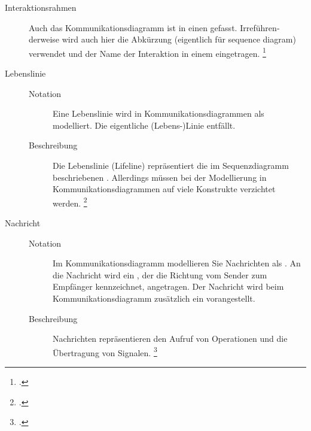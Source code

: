 \documentclass{lehramt-informatik-haupt}
\begin{document}
\begin{description}

%

\item[Interaktionsrahmen] Auch das Kommunikationsdiagramm ist in einen
 gefasst. Irreführen­ derweise wird auch hier
die Abkürzung  (eigentlich für sequence diagram) verwendet und
der Name der Interaktion in einem  eingetragen.
\footcite[Seite 478]{rupp}

%

\item[Lebenslinie] \strut
\begin{description}
\item[Notation] Eine Lebenslinie wird in Kommunikationsdiagrammen als
 modelliert. Die eigentliche (Lebens-)Linie
entfällt.

\item[Beschreibung] Die Lebenslinie (Lifeline) repräsentiert die im
Sequenzdiagramm beschriebenen . Allerdings
müssen bei der Modellierung in Kommunikationsdiagrammen auf viele
Konstrukte verzichtet werden.
\footcite[Seite 478]{rupp}
\end{description}

%

\item[Nachricht] \strut
\begin{description}
\item[Notation] Im Kommunikationsdiagramm modellieren Sie Nachrichten
als . An die Nachricht wird ein
, der die Richtung vom Sender zum Empfänger kennzeichnet,
angetragen. Der Nachricht wird beim Kommunikationsdiagramm zusätzlich
ein  vorangestellt.

\item[Beschreibung]
Nachrichten repräsentieren den Aufruf von Operationen und die
Übertragung von Signalen.
\footcite[Seite 480-481]{rupp}
\end{description}

\end{description}

\literatur
\end{document}
